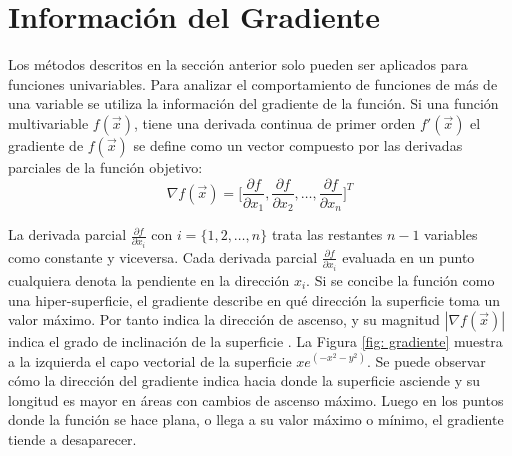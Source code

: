 \section{Información del Gradiente}
Los métodos descritos en la sección anterior solo pueden ser aplicados para funciones univariables. Para analizar el comportamiento de funciones de más de una variable se utiliza la información del gradiente de la función. Si una función multivariable $f(\vec{x})$, tiene una derivada continua de primer orden $f'(\vec{x})$ el gradiente de $f(\vec{x})$ se define como un vector compuesto por las derivadas parciales de la función objetivo:
\begin{equation}
\nabla f(\vec{x})=\bigg[ \frac{\partial f}{\partial x_1}, \frac{\partial f}{\partial x_2},\ldots,\frac{\partial f}{\partial x_n}\bigg]^T
\end{equation}

La derivada parcial  $\frac{\partial f}{\partial x_i}$ con $i=\{1,2,\ldots,n\}$ trata las restantes $n-1$ variables como constante y viceversa. Cada derivada parcial $\frac{\partial f}{\partial x_i}$ evaluada en un punto cualquiera denota la pendiente en la dirección $x_i$. Si se concibe la función como una hiper-superficie, el gradiente describe en qué dirección la superficie toma un valor máximo. Por tanto indica la dirección de ascenso, y su magnitud $|\nabla f(\vec{x})|$ indica el grado de inclinación de la superficie \cite{gilbert_calculus_2010}. La Figura \ref{fig: gradiente} muestra a la izquierda el capo vectorial de la superficie $x e^{(-x^2-y^2)}$. Se puede observar cómo la dirección del gradiente indica hacia donde la superficie asciende y su longitud es mayor en áreas con cambios de ascenso máximo. Luego en los puntos donde la función se hace plana, o llega a su valor máximo o mínimo, el gradiente tiende a desaparecer.  


